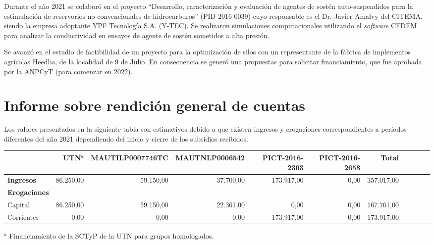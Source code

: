 \documentclass[a4paper,11pt,twoside,final,titlepage,onecolumn,openright]{report}
\begin{document}
Durante el año 2021 se colaboró en el proyecto ``Desarrollo, caracterización y evaluación de agentes de sostén auto-suspendidos para la estimulación de reservorios no convencionales de hidrocarburos'' (PID 2016-0039) cuyo responsable es el Dr. Javier Amalvy del CITEMA, siendo la empresa adoptante YPF Tecnología S.A. (Y-TEC). Se realizaron simulaciones computacionales utilizando el \textit{software} CFDEM para analizar la conductividad en ensayos de agente de sostén sometidos a alta presión.

Se avanzó en el estudio de factibilidad de un proyecto para la optimización de silos con un representante de la fábrica de implementos agrícolas Heedba, de la localidad de 9 de Julio. En consecuencia se generó una propuestas para solicitar financiamiento, que fue aprobada por la ANPCyT (para comenzar en 2022).



\chapter{Informe sobre rendición general de cuentas}

Los valores presentados en la siguiente tabla son estimativos debido a que existen ingresos y erogaciones correspondientes a períodos diferentes del año 2021 dependiendo del inicio y cierre de los subsidios recibidos.

\vspace{1cm}

\footnotesize
\begin{tabular}{ l r r r r r r r r r r }
 \toprule
                   & UTN$^a$   & MAUTILP0007746TC & MAUTNLP0006542 & PICT-2016-2303 & PICT-2016-2658 & Total\\
 \midrule
 \textbf{Ingresos} & 86.250,00 & 59.150,00    & 37.700,00     & 173.917,00  & 0,00   &  357.017,00\\
 \midrule
 \textbf{Erogaciones}\\
    Capital        & 86.250,00      & 59.150,00    & 22.361,00           &       0,00  & 0,00     &       167.761,00 \\
    Corrientes     & 0,00      & 0,00    & 0,00           & 173.917,00  & 0,00     & 173.917,00 \\
 \bottomrule
\end{tabular}

\normalsize
\vspace{0.5cm}
$^a$ Financiamiento de la SCTyP de la UTN para grupos homologados.
\end{document}
